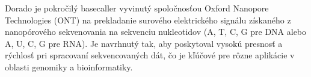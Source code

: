 Dorado je pokročilý basecaller vyvinutý spoločnosťou Oxford Nanopore Technologies (ONT) na prekladanie surového elektrického signálu získaného z nanopórového sekvenovania na sekvenciu nukleotidov (A, T, C, G pre DNA alebo A, U, C, G pre RNA).
Je navrhnutý tak, aby poskytoval vysokú presnosť a rýchlosť pri spracovaní sekvencovaných dát, čo je kľúčové pre rôzne aplikácie v oblasti genomiky a bioinformatiky.
